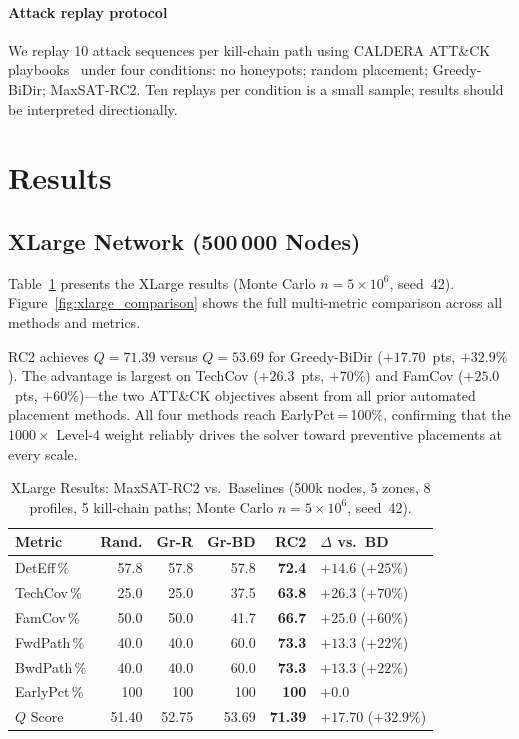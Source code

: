 \documentclass[journal]{IEEEtran}
\begin{document}
\paragraph{Attack replay protocol}
We replay 10 attack sequences per kill-chain path using CALDERA
ATT\&CK playbooks~\cite{applebaum2016} under four conditions: no
honeypots; random placement; Greedy-BiDir; MaxSAT-RC2. Ten replays per
condition is a small sample; results should be interpreted directionally.

\section{Results}
\label{sec:results}

\subsection{XLarge Network (500\,000 Nodes)}
\label{sec:results:xlarge}

Table~\ref{tab:xlarge} presents the XLarge results (Monte Carlo
$n=5\times10^6$, seed~42). Figure~\ref{fig:xlarge_comparison} shows
the full multi-metric comparison across all methods and metrics.

RC2 achieves $Q=71.39$ versus $Q=53.69$ for Greedy-BiDir
($+17.70$~pts, $+32.9\%$). The advantage is largest on
TechCov ($+26.3$~pts, $+70\%$) and FamCov ($+25.0$~pts, $+60\%$)---the
two ATT\&CK objectives absent from all prior automated placement
methods. All four methods reach EarlyPct\,=\,100\%, confirming that
the $1000\times$ Level-4 weight reliably drives the solver toward
preventive placements at every scale.

\begin{table}[t]
\caption{XLarge Results: MaxSAT-RC2 vs.\ Baselines
  (500k nodes, 5 zones, 8 profiles, 5 kill-chain paths;
  Monte Carlo $n=5\times10^6$, seed~42).}
\label{tab:xlarge}
\centering
\renewcommand{\arraystretch}{1.2}
\begin{tabular}{lrrrrl}
\toprule
Metric & Rand. & Gr-R & Gr-BD & \textbf{RC2} & $\Delta$ vs.\ BD \\
\midrule
DetEff\,\%  & 57.8 & 57.8 & 57.8 & \textbf{72.4} & $+14.6$ ($+25\%$) \\
TechCov\,\% & 25.0 & 25.0 & 37.5 & \textbf{63.8} & $+26.3$ ($+70\%$) \\
FamCov\,\%  & 50.0 & 50.0 & 41.7 & \textbf{66.7} & $+25.0$ ($+60\%$) \\
FwdPath\,\% & 40.0 & 40.0 & 60.0 & \textbf{73.3} & $+13.3$ ($+22\%$) \\
BwdPath\,\% & 40.0 & 40.0 & 60.0 & \textbf{73.3} & $+13.3$ ($+22\%$) \\
EarlyPct\,\%& 100  & 100  & 100  & \textbf{100}  & $+0.0$  \\
\midrule
$Q$ Score & 51.40 & 52.75 & 53.69 & \textbf{71.39} & $+17.70$ ($+32.9\%$) \\
\bottomrule
\end{tabular}
\end{table}
\end{document}
